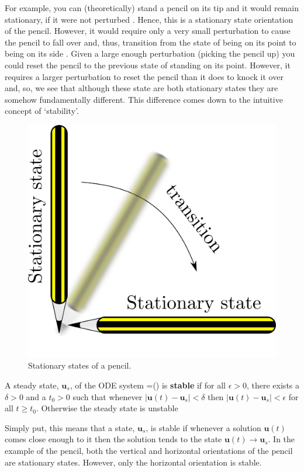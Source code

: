 For example, you can (theoretically) stand a pencil on its tip and it would remain stationary, if it were not perturbed . Hence, this is a stationary state orientation of the pencil. However, it would require only a very small perturbation to cause the pencil to fall over and, thus, transition from the state of being on its point to being on its side . Given a large enough perturbation (\ie picking the pencil up) you could reset the pencil to the previous state of standing on its point. However, it requires a larger perturbation to reset the pencil than it does to knock it over and, so, we see that although these state are both stationary states they are somehow fundamentally different. This difference comes down to the intuitive concept of `stability'.
\begin{figure}[!!!h!!!tb]
\centering
\includegraphics[width=\ttp]{../Pictures/Pencil_stationary_state.png}
\caption{\label{Pencil_stationary_state} Stationary states of a pencil.}
\end{figure}

\begin{defin}
A steady state, $\bm{u}_s$, of the ODE system
\bb
{}=()
\ee
is \textbf{stable} if for all $\epsilon >0$, there exists a $\delta > 0$ and a $t_0>0$ such that whenever $|\bm{u}(t)-\bm{u}_s|< \delta$ then $|\bm{u}(t)-\bm{u}_s|<\epsilon$ for all $t \ge t_0$. Otherwise the steady state is unstable
\end{defin}
Simply put, this means that a state, $\bm{u}_s$, is stable if whenever a solution $\bm{u}(t)$ comes close enough to it then the solution tends to the state \ie $\bm{u}(t)\rightarrow\bm{u}_s$. In the example of the pencil, both the vertical and horizontal orientations of the pencil are stationary states. However, only the horizontal orientation is stable.



